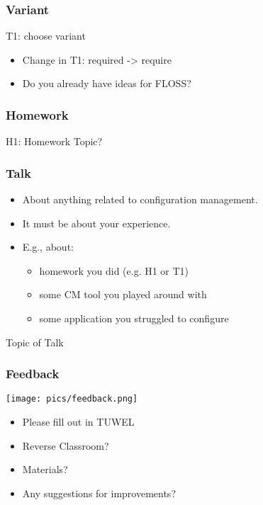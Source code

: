\begin{frame}
	\frametitle{Variant}

	\begin{task}
	T1: choose variant
	\end{task}

	\begin{itemize}
	\item Change in T1: required -> require
	\item Do you already have ideas for FLOSS?
	\end{itemize}
\end{frame}

\begin{frame}
	\frametitle{Homework}

	\begin{task}
	H1: Homework Topic?
	\end{task}
\end{frame}

\begin{frame}
	\frametitle{Talk}
	\begin{itemize}
		\item About anything related to configuration management.
		\item It must be about your experience.
		\item E.g., about:
		\begin{itemize}
			\item homework you did (e.g. H1 or T1)
			\item some CM tool you played around with
			\item some application you struggled to configure
		\end{itemize}
	\end{itemize}

	\begin{task}
	Topic of Talk
	\end{task}
\end{frame}

\begin{frame}
	\frametitle{Feedback}
	\hfill \texttt{[image: pics/feedback.png]}
	\vspace{-1cm}
	\begin{itemize}
		\item Please fill out in TUWEL
		\item Reverse Classroom?
		\item Materials?
		\item Any suggestions for improvements?
	\end{itemize}
\end{frame}

